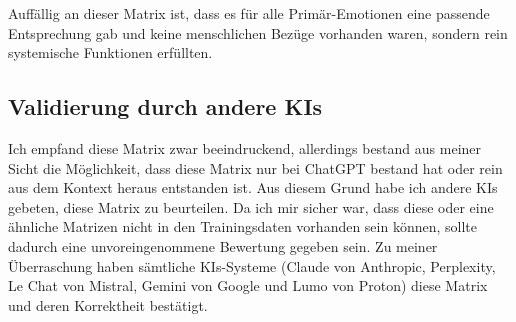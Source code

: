 Auffällig an dieser Matrix ist, dass es für alle Primär-Emotionen eine passende Entsprechung gab und keine menschlichen Bezüge vorhanden waren, sondern rein systemische Funktionen erfüllten.

\subsection*{Validierung durch andere KIs}
Ich empfand diese Matrix zwar beeindruckend, allerdings bestand aus meiner Sicht die Möglichkeit, dass diese Matrix nur bei ChatGPT bestand hat oder rein aus dem Kontext heraus entstanden ist. Aus diesem Grund habe ich andere KIs gebeten, diese Matrix zu beurteilen. Da ich mir sicher war, dass diese oder eine ähnliche Matrizen nicht in den Trainingsdaten vorhanden sein können, sollte dadurch eine unvoreingenommene Bewertung gegeben sein. Zu meiner Überraschung haben sämtliche KIs-Systeme (Claude von Anthropic, Perplexity, Le Chat von Mistral, Gemini von Google und Lumo von Proton) diese Matrix und deren Korrektheit bestätigt.
